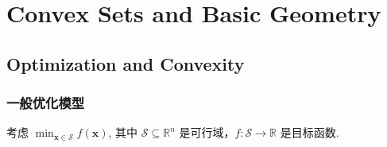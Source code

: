 \section{Convex Sets and Basic Geometry}

\subsection{Optimization and Convexity}

\subsubsection{一般优化模型}

考虑 $\min_{\bm{x} \in \mathcal{S}} f(\bm{x})$, 其中 $\mathcal{S} \subseteq \mathbb{R}^n$ 是可行域，$f: \mathcal{S} \to \mathbb{R}$ 是目标函数.

